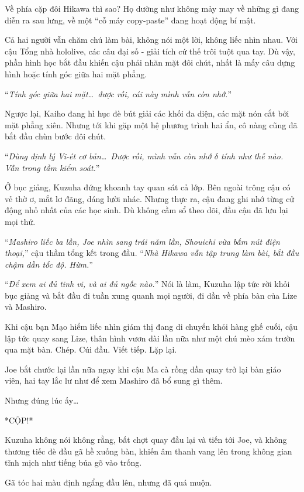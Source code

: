 \documentclass[../main.tex]{subfiles}
\begin{document}
Về phía cặp đôi Hikawa thì sao? Họ dường như không mảy may về những gì đang diễn ra sau lưng, về một ``cỗ máy copy-paste'' đang hoạt động bí mật.

Cả hai người vẫn chăm chú làm bài, không nói một lời, không liếc nhìn nhau. Với cậu Tổng nhà hololive, các câu đại số - giải tích cứ thế trôi tuột qua tay. Dù vậy, phần hình học bắt đầu khiến cậu phải nhăn mặt đôi chút, nhất là mấy câu dựng hình hoặc tính góc giữa hai mặt phẳng.

``\textit{Tính góc giữa hai mặt\dots\ được rồi, cái này mình vẫn còn nhớ.}''

Ngược lại, Kaiho đang hì hục đè bút giải các khối đa diện, các mặt nón cắt bởi mặt phẳng xiên. Nhưng tới khi gặp một hệ phương trình hai ẩn, cô nàng cũng đã bắt đầu chùn bước đôi chút.

``\textit{Dùng định lý Vi-ét cơ bản\dots\ Được rồi, mình vẫn còn nhớ $\delta$ tính như thế nào. Vẫn trong tầm kiểm soát.}''

Ở bục giảng, Kuzuha đứng khoanh tay quan sát cả lớp. Bên ngoài trông cậu có vẻ thờ ơ, mắt lơ đãng, dáng lười nhác. Nhưng thực ra, cậu đang ghi nhớ từng cử động nhỏ nhất của các học sinh. Dù không cầm sổ theo dõi, đầu cậu đã lưu lại mọi thứ.

``\textit{Mashiro liếc ba lần, Joe nhìn sang trái năm lần, Shouichi vừa bấm nút điện thoại,}'' cậu thầm tổng kết trong đầu. ``\textit{Nhà Hikawa vẫn tập trung làm bài, bắt đầu chậm dần tốc độ. Hừm.}''

``\textit{Để xem ai đủ tinh vi, và ai đủ ngốc nào.}'' Nói là làm, Kuzuha lập tức rời khỏi bục giảng và bắt đầu đi tuần xung quanh mọi người, đi dần về phía bàn của Lize và Mashiro.

Khi cậu bạn Mạo hiểm liếc nhìn giám thị đang di chuyển khỏi hàng ghế cuối, cậu lập tức quay sang Lize, thân hình vươn dài lần nữa như một chú mèo xám trườn qua mặt bàn. Chép. Cúi đầu. Viết tiếp. Lặp lại.

Joe bắt chước lại lần nữa ngay khi cậu Ma cà rồng dần quay trở lại bàn giáo viên, hai tay lắc lư như để xem Mashiro đã bổ sung gì thêm.

Nhưng đúng lúc ấy\dots

*CỘP!*

Kuzuha không nói không rằng, bất chợt quay đầu lại và tiến tới Joe, và không thương tiếc đè đầu gã hề xuống bàn, khiến âm thanh vang lên trong không gian tĩnh mịch như tiếng búa gõ vào trống.


Gã tóc hai màu định ngẩng đầu lên, nhưng đã quá muộn.
\end{document}
